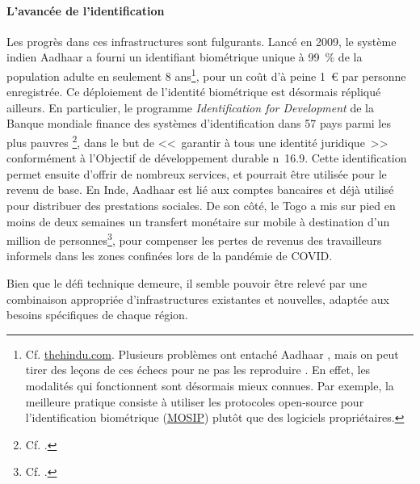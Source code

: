 \documentclass[a5paper,french,openany]{memoir}
\begin{document}
\paragraph{L'avancée de l'identification}
Les progrès dans ces infrastructures sont fulgurants. Lancé en 2009, le système indien Aadhaar a fourni un identifiant biométrique unique à 99~\% de la population adulte en seulement 8 ans\footnote{Cf. \href{https://www.thehindu.com/business/Aadhaar-covers-99-of-adults-in-India-Prasad/article17104609.ece}{thehindu.com}. 
Plusieurs problèmes ont entaché Aadhaar \citep{dreze_aadhaar_2017}, mais on peut tirer des leçons de ces échecs pour ne pas les reproduire \citep{gelb_digital_2019,muralidharan_identity_2023}. En effet, les modalités qui fonctionnent sont désormais mieux connues. Par exemple, la meilleure pratique consiste à utiliser les protocoles open-source pour l'identification biométrique (\href{https://mosip.io}{MOSIP}) plutôt que des logiciels propriétaires.}, pour un coût d'à peine 1~\euro{} par personne enregistrée. Ce déploiement de l'identité biométrique est désormais répliqué ailleurs. %
En particulier, le programme \textit{Identification for Development} de la Banque mondiale finance des systèmes d'identification dans 57 pays parmi les plus pauvres 
\footnote{Cf. \cite{world_bank_state_2017,world_bank_benin_2020,world_bank_identification_2022}.}, dans le but de <<~garantir à tous une identité juridique~>> conformément à l'Objectif de développement durable n\textdegree{}~16.9. Cette identification permet ensuite d'offrir de nombreux services, et pourrait être utilisée pour le revenu de base. En Inde, Aadhaar est lié aux comptes bancaires et déjà utilisé pour distribuer des prestations sociales. De son côté, le Togo a mis sur pied en moins de deux semaines un transfert monétaire sur mobile à destination d'un million de personnes\footnote{Cf. \cite{ipa_togos_2021}.}, pour compenser les pertes de revenus des travailleurs informels dans les zones confinées lors de la pandémie de COVID. 

Bien que le défi technique demeure, il semble pouvoir être relevé par une combinaison appropriée d'infrastructures existantes et nouvelles, adaptée aux besoins spécifiques de chaque région. 
\end{document}
